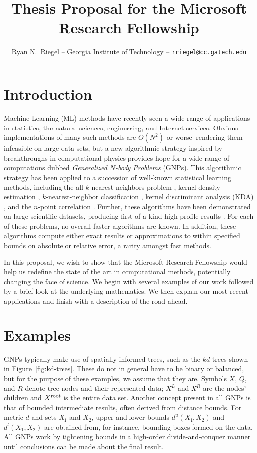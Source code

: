 \documentclass[twoside,leqno,twocolumn]{article}
\title{Thesis Proposal for the Microsoft Research Fellowship}
\author{Ryan N.~Riegel --
    Georgia Institute of Technology --
    \texttt{rriegel@cc.gatech.edu}
}
\date{}
\newcommand{\kdroot}[1]{#1^{\rm root}}
\newcommand{\kdleft}[1]{#1^{\!L}}
\newcommand{\kdright}[1]{#1^{\!R}}
\newcommand{\lo}[1]{#1^{l}}
\newcommand{\hi}[1]{#1^{u}}
\begin{document}
\maketitle

\section{Introduction}
Machine Learning (ML) methods have recently seen a wide range of
applications in statistics, the natural sciences, engineering, and
Internet services.  Obvious implementations of many such methods are
$O(N^2)$ or worse, rendering them infeasible on large data sets, but a
new algorithmic strategy \cite{nips2000paper} inspired by
breakthroughs in computational physics \cite{appel2, barnes_hut,
grngard} provides hope for a wide range of computations dubbed {\em
Generalized $N$-body Problems} (GNPs).  This algorithmic strategy has
been applied to a succession of well-known statistical learning
methods, including the all-$k$-nearest-neighbors problem
\cite{nips2000paper}, kernel density estimation \cite{nips2000paper,
kde-siamdm, kde-nips-dong, kde-uai-dong}, $k$-nearest-neighbor
classification \cite{ting-liu}, kernel discriminant analysis (KDA)
\cite{nbc-compstat}, and the $n$-point correlation
\cite{nips2000paper, moore-npt}.  Further, these algorithms have been
demonstrated on large scientific datasets, producing first-of-a-kind
high-profile results \cite{science03, nature05}.  For each of these
problems, no overall faster algorithms are known.  In addition, these
algorithms compute either exact results or approximations to within
specified bounds on absolute or relative error, a rarity amongst fast
methods.

In this proposal, we wish to show that the Microsoft Research
Fellowship would help us redefine the state of the art in
computational methods, potentially changing the face of science.  We
begin with several examples of our work followed by a brief look at
the underlying mathematics.  We then explain our most recent
applications and finish with a description of the road ahead.

\section{Examples}
GNPs typically make use of spatially-informed trees, such as the
$kd$-trees \cite{preparata} shown in Figure~\ref{fig:kd-trees}.  These
do not in general have to be binary or balanced, but for the purpose
of these examples, we assume that they are.  Symbols $X$, $Q$, and $R$
denote tree nodes and their represented data; $\kdleft{X}$ and
$\kdright{X}$ are the nodes' children and $\kdroot{X}$ is the entire
data set.  Another concept present in all GNPs is that of bounded
intermediate results, often derived from distance bounds.  For metric
$d$ and sets $X_1$ and $X_2$, upper and lower bounds $\hi{d}(X_1,X_2)$
and $\lo{d}(X_1,X_2)$ are obtained from, for instance, bounding boxes
formed on the data.  All GNPs work by tightening bounds in a
high-order divide-and-conquer manner until conclusions can be made
about the final result.
\end{document}
